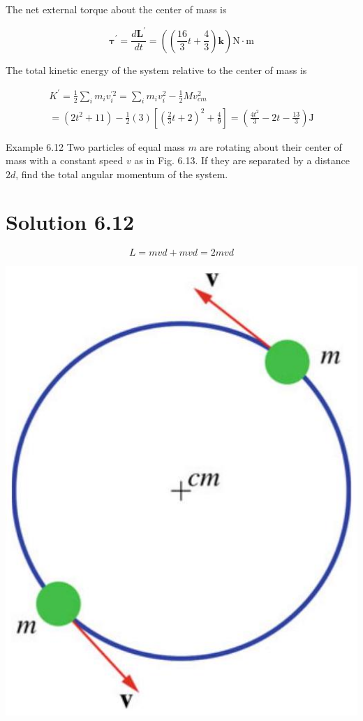 \documentclass[10pt]{article}
\begin{document}
The net external torque about the center of mass is

$$
\boldsymbol{\tau}^{\prime}=\frac{d \mathbf{L}^{\prime}}{d t}=\left(\left(\frac{16}{3} t+\frac{4}{3}\right) \mathbf{k}\right) \mathrm{N} \cdot \mathrm{m}
$$

The total kinetic energy of the system relative to the center of mass is

$$
\begin{gathered}
K^{\prime}=\frac{1}{2} \sum_{i} m_{i} v_{i}^{\prime 2}=\sum_{i} m_{i} v_{i}^{2}-\frac{1}{2} M v_{c m}^{2} \\
=\left(2 t^{2}+11\right)-\frac{1}{2}(3)\left[\left(\frac{2}{3} t+2\right)^{2}+\frac{4}{9}\right]=\left(\frac{4 t^{2}}{3}-2 t-\frac{13}{3}\right) \mathrm{J}
\end{gathered}
$$

Example 6.12 Two particles of equal mass $m$ are rotating about their center of mass with a constant speed $v$ as in Fig. 6.13. If they are separated by a distance $2 d$, find the total angular momentum of the system.

\section*{Solution 6.12}
$$
L=m v d+m v d=2 m v d
$$

\begin{center}
\includegraphics[max width=\textwidth]{2024_09_13_db1f357d2aad0a03eb2eg-106}
\end{center}
\end{document}
